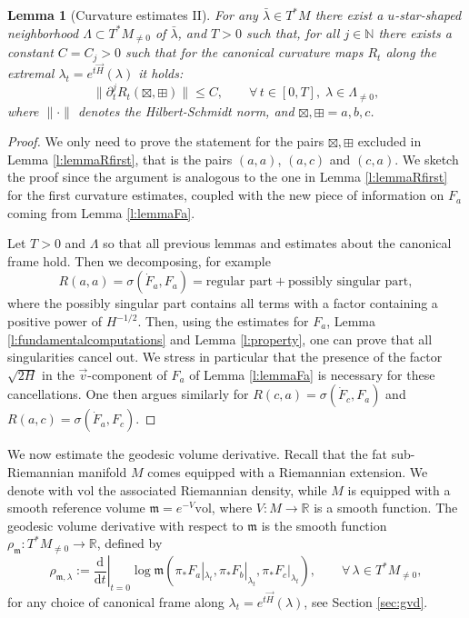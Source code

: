 \documentclass[11pt,a4paper]{article}
\theoremstyle{plain}
\newtheorem{lemma}[theorem]{Lemma}
\theoremstyle{definition}
\theoremstyle{remark}
\numberwithin{equation}{section}
\newcommand{\R}{\mathbb{R}} %
\newcommand{\N}{\mathbb{N}} %
\newcommand{\di}{\mathrm{d}}
\newcommand{\mm}{\mathfrak m}
\begin{document}
\begin{lemma}[Curvature estimates II]\label{l:lemmaRlast}
For any $\bar{\lambda} \in T^*M$ there exist a $u$-star-shaped neighborhood $\Lambda \subset T^*M_{\neq 0}$ of $\bar{\lambda}$, and $T>0$ such that, for all $j\in \N$ there exists a constant $C=C_j>0$ such that for the canonical curvature maps $R_{t}$ along the extremal $\lambda_t = e^{t\vec{H}}(\lambda)$ it holds:
\begin{equation}
\|\partial_t^j R_{t}(\boxtimes,\boxplus)\| \leq C, \qquad \forall\, t\in [0,T],\; \lambda \in \Lambda_{\neq 0},
\end{equation}
where $\|\cdot\|$ denotes the Hilbert-Schmidt norm, and $\boxtimes,\boxplus = a,b,c$.
\end{lemma}
\begin{proof}
We only need to prove the statement for the pairs $\boxtimes,\boxplus$ excluded in Lemma \ref{l:lemmaRfirst}, that is the pairs $(a,a)$, $(a,c)$ and $(c,a)$. We sketch the proof since the argument is analogous to the one in Lemma \ref{l:lemmaRfirst} for the first curvature estimates, coupled with the new piece of information on $F_a$ coming from Lemma \ref{l:lemmaFa}. 

Let $T>0$ and $\Lambda$ so that all previous lemmas and estimates about the canonical frame hold. Then we decomposing, for example
\begin{equation}
R(a,a)  = \sigma(\dot{F}_a,F_a)=\text{regular part} + \text{possibly singular part},
\end{equation}
where the possibly singular part contains all terms with a factor containing a positive power of $H^{-1/2}$. Then, using the estimates for $F_a$, Lemma \ref{l:fundamentalcomputations} and Lemma \ref{l:property}, one can prove that all singularities cancel out. We stress in particular that the presence of the factor $\sqrt{2H}$ in the $\vec{v}$-component of $F_a$ of Lemma \ref{l:lemmaFa} is necessary for these cancellations. One then argues similarly for $R(c,a) = \sigma(\dot{F}_c,F_a)$ and $R(a,c) = \sigma(\dot{F}_a,F_c)$.
\end{proof}

We now estimate the geodesic volume derivative. Recall that the fat sub-Riemannian manifold $M$ comes equipped with a Riemannian extension. We denote with $\mathrm{vol}$ the associated Riemannian density, while $M$ is equipped with a smooth reference volume $\mm = e^{-V}\mathrm{vol}$, where $V:M \to \R$ is a smooth function. The geodesic volume derivative with respect to $\mm$ is the smooth function $\rho_{\mm}:T^*M_{\neq 0} \to \R$, defined by
\begin{equation}\label{eq:volder}
\rho_{\mm,\lambda} := \left.\frac{\di}{\di t}\right|_{t=0}\log\mm(\pi_* F_a|_{\lambda_t},\pi_* F_b|_{\lambda_t},\pi_*F_c|_{\lambda_t}), \qquad \forall\, \lambda \in T^*M_{\neq 0},
\end{equation}
for any choice of canonical frame along $\lambda_t=e^{t\vec{H}}(\lambda)$, see Section \ref{sec:gvd}.
\end{document}
